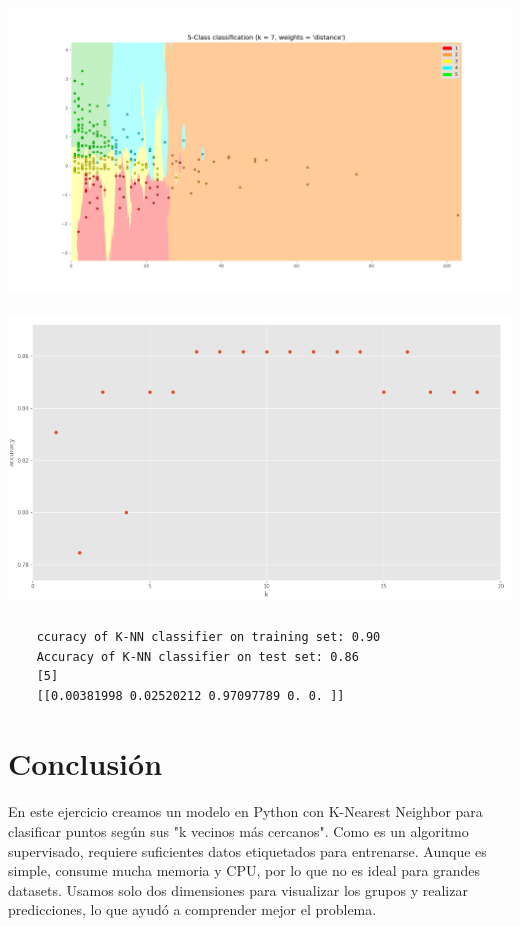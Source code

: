 \documentclass{article}
\begin{document}
\includegraphics[width=14cm, height=8cm]{Figure_4.png} 
\\
\includegraphics[width=14cm, height=8cm]{Figure_5.png} 
\begin{verbatim}
    ccuracy of K-NN classifier on training set: 0.90
    Accuracy of K-NN classifier on test set: 0.86
    [5]
    [[0.00381998 0.02520212 0.97097789 0. 0. ]]
\end{verbatim}

\section{Conclusi\'on}
En este ejercicio creamos un modelo en Python con K-Nearest Neighbor para clasificar puntos según sus "k vecinos más cercanos". Como es un algoritmo supervisado, requiere suficientes datos etiquetados para entrenarse. Aunque es simple, consume mucha memoria y CPU, por lo que no es ideal para grandes datasets. Usamos solo dos dimensiones para visualizar los grupos y realizar predicciones, lo que ayudó a comprender mejor el problema.
\end{document}
